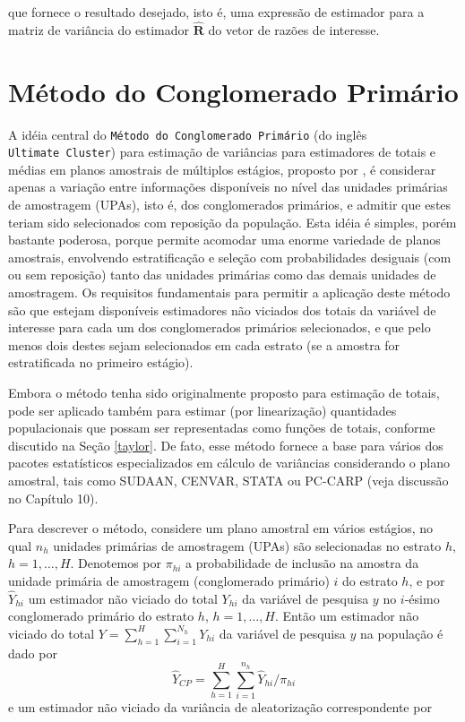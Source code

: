\documentclass[]{book}
\numberwithin{example}{chapter}
\numberwithin{remark}{chapter}
\numberwithin{definition}{chapter}
\begin{document}
que fornece o resultado desejado, isto é, uma expressão de estimador
para a matriz de variância do estimador \(\widehat{\mathbf{R}}\) do
vetor de razões de interesse.

\section{Método do Conglomerado
Primário}\label{metodo-do-conglomerado-primario}

A idéia central do \texttt{Método\ do\ Conglomerado\ Primário} (do
inglês \texttt{Ultimate\ Cluster}) para estimação de variâncias para
estimadores de totais e médias em planos amostrais de múltiplos
estágios, proposto por \citep{hansen}, é considerar apenas a variação
entre informações disponíveis no nível das unidades primárias de
amostragem (UPAs), isto é, dos conglomerados primários, e admitir que
estes teriam sido selecionados com reposição da população. Esta idéia é
simples, porém bastante poderosa, porque permite acomodar uma enorme
variedade de planos amostrais, envolvendo estratificação e seleção com
probabilidades desiguais (com ou sem reposição) tanto das unidades
primárias como das demais unidades de amostragem. Os requisitos
fundamentais para permitir a aplicação deste método são que estejam
disponíveis estimadores não viciados dos totais da variável de interesse
para cada um dos conglomerados primários selecionados, e que pelo menos
dois destes sejam selecionados em cada estrato (se a amostra for
estratificada no primeiro estágio).

Embora o método tenha sido originalmente proposto para estimação de
totais, pode ser aplicado também para estimar (por linearização)
quantidades populacionais que possam ser representadas como funções de
totais, conforme discutido na Seção \ref{taylor}. De fato, esse método
fornece a base para vários dos pacotes estatísticos especializados em
cálculo de variâncias considerando o plano amostral, tais como SUDAAN,
CENVAR, STATA ou PC-CARP (veja discussão no Capítulo 10).

Para descrever o método, considere um plano amostral em vários estágios,
no qual \(n_{h}\) unidades primárias de amostragem (UPAs) são
selecionadas no estrato \(h,\) \(h=1,\ldots ,H\). Denotemos por
\(\pi_{hi}\) a probabilidade de inclusão na amostra da unidade primária
de amostragem (conglomerado primário) \(i\) do estrato \(h\), e por
\(\widehat{Y}_{hi}\) um estimador não viciado do total \(Y_{hi}\) da
variável de pesquisa \(y\) no \(i\)-ésimo conglomerado primário do
estrato \(h\), \(h=1,\ldots ,H\). Então um estimador não viciado do
total \(Y=\sum_{h=1}^{H}\sum_{i=1}^{N_{h}}Y_{hi}\) da variável de
pesquisa \(y\) na população é dado por \[
\widehat{Y}_{CP}=\sum_{h=1}^{H}\sum_{i=1}^{n_{h}}\widehat{Y}_{hi}/\pi _{hi} 
\] e um estimador não viciado da variância de aleatorização
correspondente por
\end{document}
